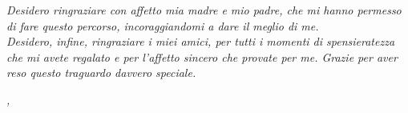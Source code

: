 
\noindent \textit{Desidero ringraziare con affetto mia madre e mio padre, che
	mi
	hanno permesso di fare questo percorso, incoraggiandomi a dare il
	meglio di me.}\\

\noindent \textit{Desidero, infine, ringraziare i miei amici, per tutti i
	momenti di spensieratezza che mi avete regalato e per l'affetto sincero
	che
	provate per me. Grazie per aver reso questo traguardo davvero
	speciale.}\\

\bigskip

\noindent\textit{\myLocation, \myTime}
\hfill \myName

\endgroup